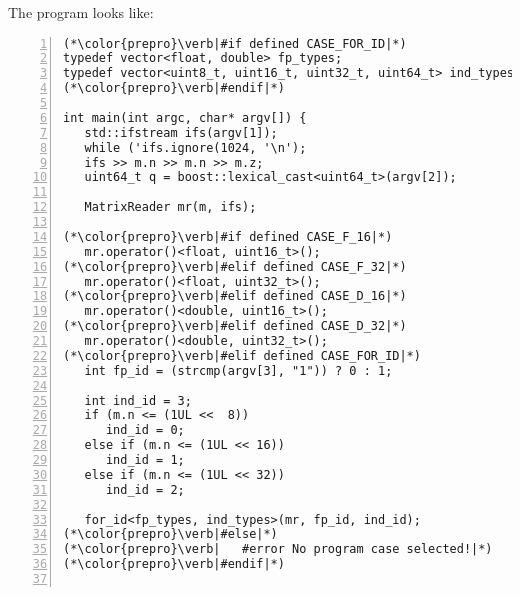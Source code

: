 \documentclass[10pt,a4paper]{article}
\theoremstyle{definition}\newtheorem{problem}{Problem}
\begin{document}
\noindent
The program looks like:
{\small
\begin{lstlisting}[numbers=left,xleftmargin=2em]
(*\color{prepro}\verb|#if defined CASE_FOR_ID|*)
typedef vector<float, double> fp_types;                                (* \label{lst:test:fpt} *)
typedef vector<uint8_t, uint16_t, uint32_t, uint64_t> ind_types;       (* \label{lst:test:indt} *)
(*\color{prepro}\verb|#endif|*)

int main(int argc, char* argv[]) {
   std::ifstream ifs(argv[1]);                                         (* \label{lst:test:fop} *)
   while ('ifs.ignore(1024, '\n');                                          (* \label{lst:test:heade} *)
   ifs >> m.n >> m.n >> m.z;                                           (* \label{lst:test:dims} *)
   uint64_t q = boost::lexical_cast<uint64_t>(argv[2]);                (* \label{lst:test:iters} *)

   MatrixReader mr(m, ifs);                                            (* \label{lst:test:mr} *)

(*\color{prepro}\verb|#if defined CASE_F_16|*)                         (* \label{lst:test:mrab} *)
   mr.operator()<float, uint16_t>(); 
(*\color{prepro}\verb|#elif defined CASE_F_32|*)
   mr.operator()<float, uint32_t>(); 
(*\color{prepro}\verb|#elif defined CASE_D_16|*)
   mr.operator()<double, uint16_t>(); 
(*\color{prepro}\verb|#elif defined CASE_D_32|*)
   mr.operator()<double, uint32_t>();                                  (* \label{lst:test:mram} *)
(*\color{prepro}\verb|#elif defined CASE_FOR_ID|*)
   int fp_id = (strcmp(argv[3], "1")) ? 0 : 1;                         (* \label{lst:test:fpid} *)

   int ind_id = 3;                                                     (* \label{lst:test:indidb} *)
   if (m.n <= (1UL <<  8))
      ind_id = 0;
   else if (m.n <= (1UL << 16))
      ind_id = 1;
   else if (m.n <= (1UL << 32))
      ind_id = 2;                                                     (* \label{lst:test:indide} *)

   for_id<fp_types, ind_types>(mr, fp_id, ind_id);                    (* \label{lst:test:mrafi} *)
(*\color{prepro}\verb|#else|*)
(*\color{prepro}\verb|   #error No program case selected!|*)
(*\color{prepro}\verb|#endif|*)                                       (* \label{lst:test:mrae} *)


\end{lstlisting}}
\end{document}

